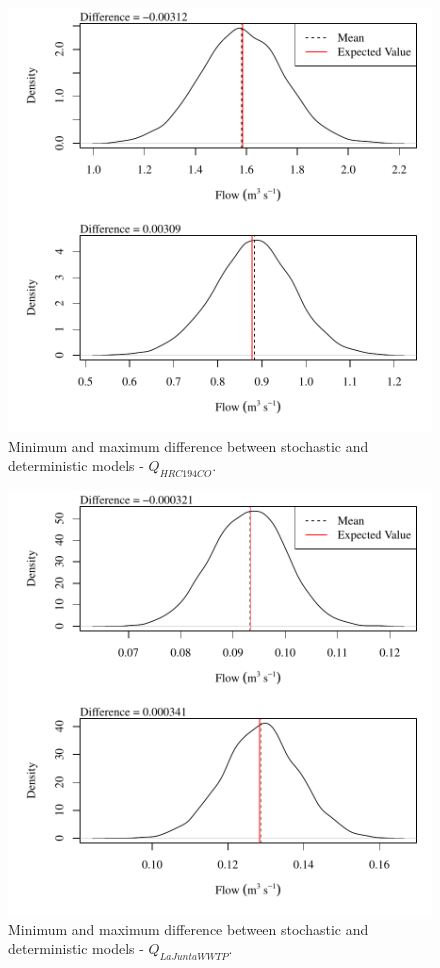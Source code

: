 \begin{center}
\begin{figure}[htbp]
	\includegraphics[width=6in]{"Figures/Results_USR/V min-max diff qHRC"}
	\caption{Minimum and maximum difference between stochastic and deterministic models - $Q_{HRC194CO}$.}
\end{figure}
\end{center}
\newpage

\begin{center}
\begin{figure}[htbp]
	\includegraphics[width=6in]{"Figures/Results_USR/V min-max diff qWTP"}
	\caption{Minimum and maximum difference between stochastic and deterministic models - $Q_{LaJuntaWWTP}$.}
\end{figure}
\end{center}
\newpage

